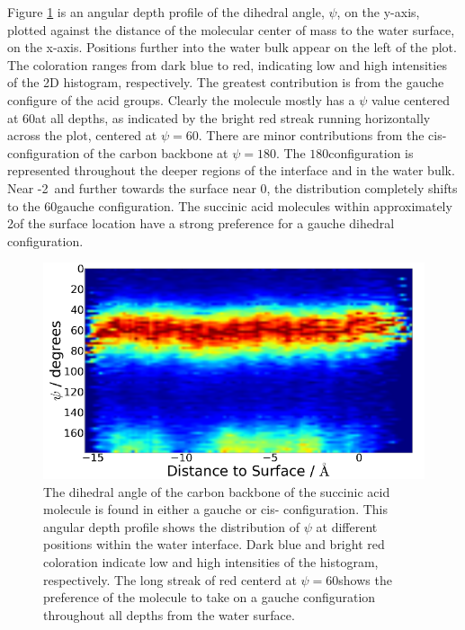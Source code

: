 Figure \ref{fig:dihedral} is an angular depth profile of the dihedral angle, $\psi$, on the y-axis, plotted against the distance of the molecular center of mass to the water surface, on the x-axis. Positions further into the water bulk appear on the left of the plot. The coloration ranges from dark blue to red, indicating low and high intensities of the 2D histogram, respectively. The greatest contribution is from the gauche configure of the acid groups. Clearly the molecule mostly has a $\psi$ value centered at 60\textdegree at all depths, as indicated by the bright red streak running horizontally across the plot, centered at $\psi=60$\textdegree. There are minor contributions from the cis-configuration of the carbon backbone at $\psi = 180$\textdegree. The $180$\textdegree configuration is represented throughout the deeper regions of the interface and in the water bulk. Near -2\angs~and further towards the surface near 0\angs, the distribution completely shifts to the $60$\textdegree gauche configuration. The succinic acid molecules within approximately 2\angs of the surface location have a strong preference for a gauche dihedral configuration. 


\begin{figure}[h!]
	\begin{center}
		\includegraphics[scale=1.0]{images/dihedral/dihedral-small.png}
		\caption{The dihedral angle of the carbon backbone of the succinic acid molecule is found in either a gauche or cis- configuration. This angular depth profile shows the distribution of $\psi$ at different positions within the water interface. Dark blue and bright red coloration indicate low and high intensities of the histogram, respectively. The long streak of red centerd at $\psi=60$\textdegree shows the preference of the molecule to take on a gauche configuration throughout all depths from the water surface.}
		\label{fig:dihedral}
	\end{center}
\end{figure}



